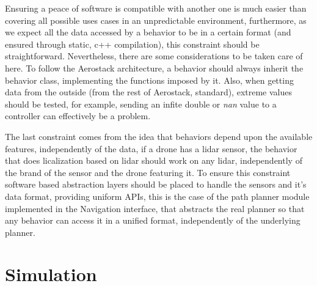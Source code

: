 
  Ensuring a peace of software is compatible with another one is much easier than covering all possible uses cases in an unpredictable environment, furthermore, as we expect all the data accessed by a behavior to be in a certain format (and ensured through static, c++ compilation), this constraint should be straightforward. Nevertheless, there are some considerations to be taken care of here. To follow the Aerostack architecture, a behavior should always inherit the behavior class, implementing the functions imposed by it. Also, when getting data from the outside (from the rest of Aerostack, standard), extreme values should be tested, for example, sending an infite double or \textit{nan} value to a controller can effectively be a problem.

  The last constraint comes from the idea that behaviors depend upon the available features, independently of the data, if a drone has a lidar sensor, the behavior that does licalization based on lidar should work on any lidar, independently of the brand of the sensor and the drone featuring it. To ensure this constraint software based abstraction layers should be placed to handle the sensors and it's data format, providing uniform APIs, this is the case of the path planner module implemented in the Navigation interface, that abstracts the real planner so that any behavior can access it in a unified format, independently of the underlying planner.

\pagebreak

\section{Simulation} \label{ch_5:sect:simulation}

